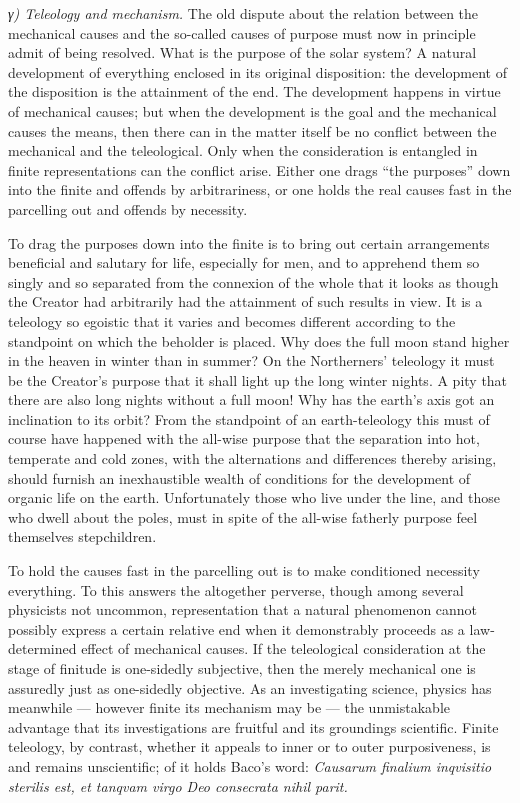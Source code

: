 \documentclass[12pt,a4paper]{book}
\newcommand{\subrunin}[1]{\emph{#1}\hspace{0.4em}}
\begin{document}
\subrunin{γ) Teleology and mechanism.} The old dispute about the relation between the mechanical causes and the
so-called causes of purpose must now in principle admit of being resolved. What is the purpose of the solar system?
A natural development of everything enclosed in its original disposition:
the development of the disposition is the attainment of the end. The development happens in virtue of mechanical
causes; but when the development is the goal and the mechanical causes the means, then there can in the matter
itself be no conflict between the mechanical and the teleological. Only when the consideration is entangled in
finite representations can the conflict arise. Either one drags ``the purposes'' down into the finite and offends
by arbitrariness, or one holds the real causes fast in the parcelling out and offends by necessity.

To drag the purposes down into the finite is to bring out certain arrangements beneficial and salutary for life,
especially for men, and to apprehend them so singly and so separated from the connexion of the whole that it looks
as though the Creator had arbitrarily had the attainment of such results in view. It is a teleology so egoistic
that it varies and becomes different according to the standpoint on which the beholder is placed. Why does the full
moon stand higher in the heaven in winter than in summer? On the Northerners' teleology it must be the Creator's
purpose that it shall light up the long winter nights. A pity that there are also long nights without a full moon!
Why has the earth's axis got an inclination to its orbit? From the standpoint of an earth-teleology this must of
course have happened with the all-wise purpose that the separation into hot, temperate and cold zones, with the
alternations and differences thereby arising, should furnish an inexhaustible wealth of conditions for the
development of organic life on the earth. Unfortunately those who live under the line, and those who dwell about
the poles, must in spite of the all-wise fatherly purpose feel themselves stepchildren.

To hold the causes fast in the parcelling out is to make conditioned necessity everything. To this answers the
altogether perverse, though among several physicists not
uncommon, representation that a natural phenomenon cannot possibly express a certain relative end when it demonstrably
proceeds as a law-determined effect of mechanical causes. If the teleological consideration at the stage of finitude
is one-sidedly subjective, then the merely mechanical one is assuredly just as one-sidedly objective. As an
investigating science, physics has meanwhile --- however finite its mechanism may be --- the unmistakable advantage
that its investigations are fruitful and its groundings scientific. Finite teleology, by contrast, whether it appeals
to inner or to outer purposiveness, is and remains unscientific; of it holds Baco's word: \textit{Causarum finalium
inqvisitio sterilis est, et tanqvam virgo Deo consecrata nihil parit.}
\end{document}
